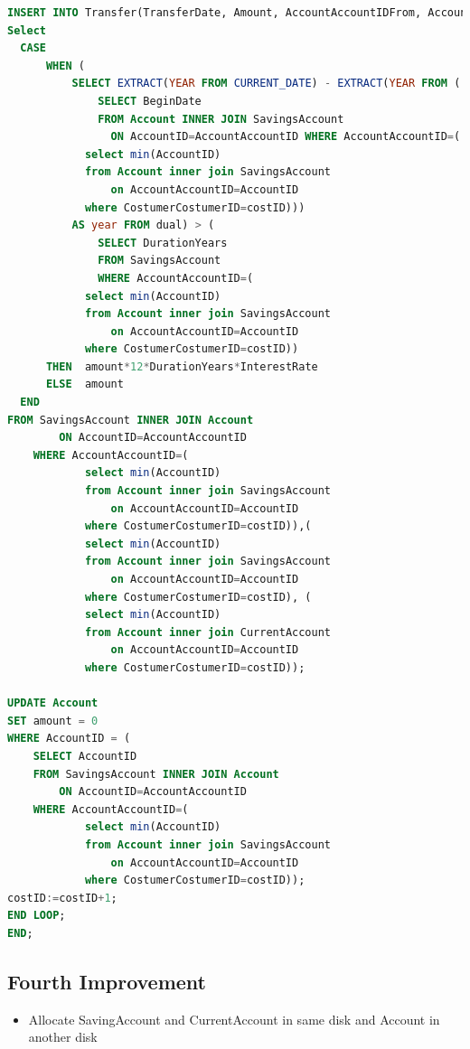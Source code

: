 \documentclass[a4paper, 10pt]{article}
\begin{document}
\begin{lstlisting}[language=SQL]
INSERT INTO Transfer(TransferDate, Amount, AccountAccountIDFrom, AccountAccountIDTo) VALUES (CURRENT_DATE, (
Select
  CASE
      WHEN (
          SELECT EXTRACT(YEAR FROM CURRENT_DATE) - EXTRACT(YEAR FROM (
              SELECT BeginDate 
              FROM Account INNER JOIN SavingsAccount 
                ON AccountID=AccountAccountID WHERE AccountAccountID=(
            select min(AccountID) 
            from Account inner join SavingsAccount 
                on AccountAccountID=AccountID 
            where CostumerCostumerID=costID))) 
          AS year FROM dual) > (
              SELECT DurationYears 
              FROM SavingsAccount 
              WHERE AccountAccountID=(
            select min(AccountID) 
            from Account inner join SavingsAccount 
                on AccountAccountID=AccountID 
            where CostumerCostumerID=costID))
      THEN  amount*12*DurationYears*InterestRate
      ELSE  amount
  END
FROM SavingsAccount INNER JOIN Account
        ON AccountID=AccountAccountID
    WHERE AccountAccountID=(
            select min(AccountID) 
            from Account inner join SavingsAccount 
                on AccountAccountID=AccountID 
            where CostumerCostumerID=costID)),(
            select min(AccountID) 
            from Account inner join SavingsAccount 
                on AccountAccountID=AccountID 
            where CostumerCostumerID=costID), (
            select min(AccountID) 
            from Account inner join CurrentAccount 
                on AccountAccountID=AccountID 
            where CostumerCostumerID=costID));

UPDATE Account
SET amount = 0
WHERE AccountID = (
    SELECT AccountID 
    FROM SavingsAccount INNER JOIN Account 
        ON AccountID=AccountAccountID 
    WHERE AccountAccountID=(
            select min(AccountID) 
            from Account inner join SavingsAccount 
                on AccountAccountID=AccountID 
            where CostumerCostumerID=costID));
costID:=costID+1;
END LOOP;
END;
\end{lstlisting}

\subsection{Fourth Improvement}
\begin{itemize}
  \item Allocate SavingAccount and CurrentAccount in same disk and Account in another disk
\end{itemize}
\end{document}
